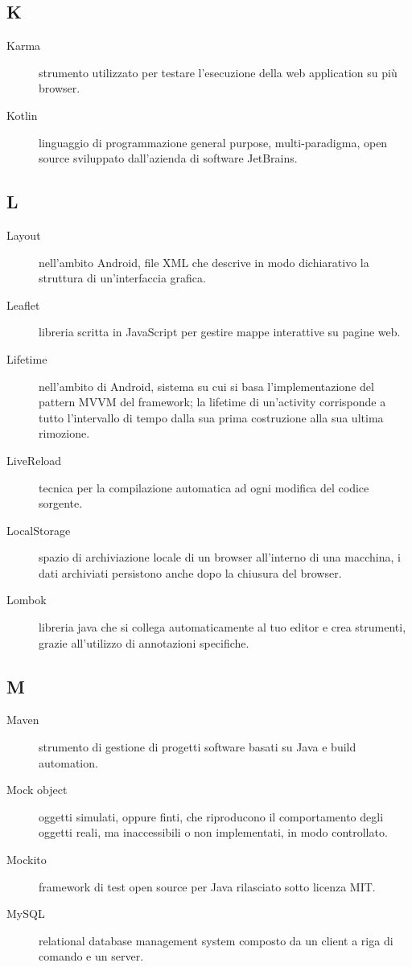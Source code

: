 \documentclass[../manuale-manutentore.tex]{subfiles}
\begin{document}
\subsection{K}

\begin{description}
    \item[Karma] strumento utilizzato per testare l'esecuzione della web application su più browser.
    \item[Kotlin] linguaggio di programmazione general purpose, multi-paradigma, open source sviluppato dall'azienda di software JetBrains.
\end{description}

\subsection{L}

\begin{description}
    \item[Layout] nell'ambito Android, file XML che descrive in modo dichiarativo la struttura di un'interfaccia grafica.
    \item[Leaflet] libreria scritta in JavaScript per gestire mappe interattive su pagine web.
    \item[Lifetime] nell'ambito di Android, sistema su cui si basa l'implementazione del pattern MVVM del framework; la lifetime di un'activity corrisponde a tutto l'intervallo di tempo dalla sua prima costruzione alla sua ultima rimozione.
    \item[LiveReload] tecnica per la compilazione automatica ad ogni modifica del codice sorgente.
    \item[LocalStorage] spazio di archiviazione locale di un browser all'interno di una macchina, i dati archiviati persistono anche dopo la chiusura del browser.
    \item[Lombok] libreria java che si collega automaticamente al tuo editor e crea strumenti, grazie all'utilizzo di annotazioni specifiche.
\end{description}

\subsection{M}

\begin{description}
    \item[Maven] strumento di gestione di progetti software basati su Java e build automation.
    \item[Mock object] oggetti simulati, oppure finti, che riproducono il comportamento degli oggetti reali, ma inaccessibili o non implementati, in modo controllato.
    \item[Mockito] framework di test open source per Java rilasciato sotto licenza MIT\@.
    \item[MySQL] relational database management system composto da un client a riga di comando e un server.
\end{description}
\end{document}

